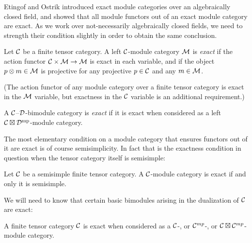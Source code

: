 \documentclass{amsart}
\begin{document}
Etingof and Ostrik introduced exact module categories over an algebraically closed field, and showed that all module functors out of an exact module category are exact.  As we work over not-necessarily algebraically closed fields, we need to strength their condition slightly in order to obtain the same conclusion.

\begin{definition}
Let $\mathcal C$ be a finite tensor category.  A left $\mathcal C$-module category $\mathcal M$ is \emph{exact} if the action functor $\mathcal C \times \mathcal M \rightarrow \mathcal M$ is exact in each variable, and if the object $p \otimes m \in \mathcal M$ is projective for any projective $p \in \mathcal C$ and any $m \in \mathcal M$.
\end{definition}

\nid (The action functor of any module category over a finite tensor category is exact in the $\mathcal M$ variable, but exactness in the $\mathcal C$ variable is an additional requirement.) %

\begin{definition}
A $\mathcal C$--$\mathcal D$-bimodule category is \emph{exact} if it is exact when considered as a left $\mathcal C \boxtimes \mathcal D^{\mathrm{mp}}$-module category.
\end{definition}

The most elementary condition on a module category that ensures functors out of it are exact is of course semisimplicity.  In fact that is the exactness condition in question when the tensor category itself is semisimple:

\begin{example} \label{eg:semiexact}
Let $\mathcal C$ be a semisimple finite tensor category.  A $\mathcal C$-module category is exact if and only it is semisimple.
\end{example}

\nid We will need to know that certain basic bimodules arising in the dualization of $\mathcal C$ are exact:

\begin{example} \label{ex:exactness}
	A finite tensor category $\mathcal C$ is exact when considered as a $\mathcal C$-, or $\mathcal C^{mp}$-, or $\mathcal C \boxtimes \mathcal C^{mp}$-module category. 
\end{example} %
\end{document}
